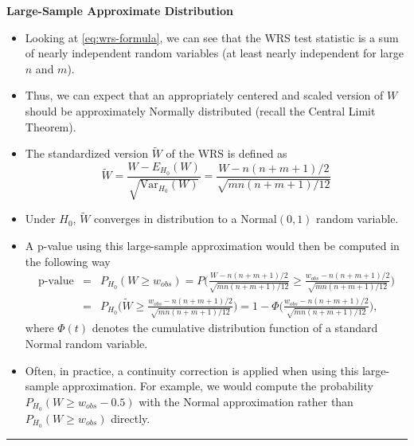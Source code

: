 \documentclass[]{book}
\begin{document}
\textbf{Large-Sample Approximate Distribution}

\begin{itemize}
\item
  Looking at \eqref{eq:wrs-formula}, we can see that the
  WRS test statistic is a sum of nearly independent random variables
  (at least nearly independent for large \(n\) and \(m\)).
\item
  Thus, we can expect that an appropriately centered and scaled
  version of \(W\) should be approximately Normally distributed (recall the Central Limit Theorem).
\item
  The standardized version \(\tilde{W}\) of the WRS is defined as
  \begin{equation}
  \tilde{W} = \frac{W - E_{H_{0}}(W)}{ \sqrt{\textrm{Var}_{H_{0}}(W) }  }
  = \frac{W - n(n+m+1)/2}{ \sqrt{ mn(n + m + 1)/12 }  }
  \end{equation}
\item
  Under \(H_{0}\), \(\tilde{W}\) converges in distribution to a Normal\((0,1)\) random variable.
\item
  A p-value using this large-sample approximation would then be computed in the following
  way
  \begin{eqnarray}
  \textrm{p-value} &=& P_{H_{0}}( W \geq w_{obs}) 
  = P\Bigg( \frac{W - n(n+m+1)/2}{ \sqrt{ mn(n + m + 1)/12 }  } \geq \frac{w_{obs} - n(n+m+1)/2}{ \sqrt{ mn(n + m + 1)/12 }  }\Bigg)
  \nonumber \\
  &=& P_{H_{0}}\Big( \tilde{W} \geq \frac{w_{obs} - n(n+m+1)/2}{ \sqrt{ mn(n + m + 1)/12 }  }\Big)
  = 1 - \Phi\Bigg( \frac{w_{obs} - n(n+m+1)/2}{ \sqrt{ mn(n + m + 1)/12 }  }  \Bigg), \nonumber
  \end{eqnarray}
  where \(\Phi(t)\) denotes the cumulative distribution function of a standard Normal random variable.
\item
  Often, in practice, a continuity correction is applied when using this large-sample approximation.
  For example, we would compute the probability \(P_{H_{0}}(W \geq w_{obs} - 0.5)\) with the Normal approximation
  rather than \(P_{H_{0}}(W \geq w_{obs})\) directly.
\end{itemize}

\begin{center}\rule{0.5\linewidth}{\linethickness}\end{center}
\end{document}
